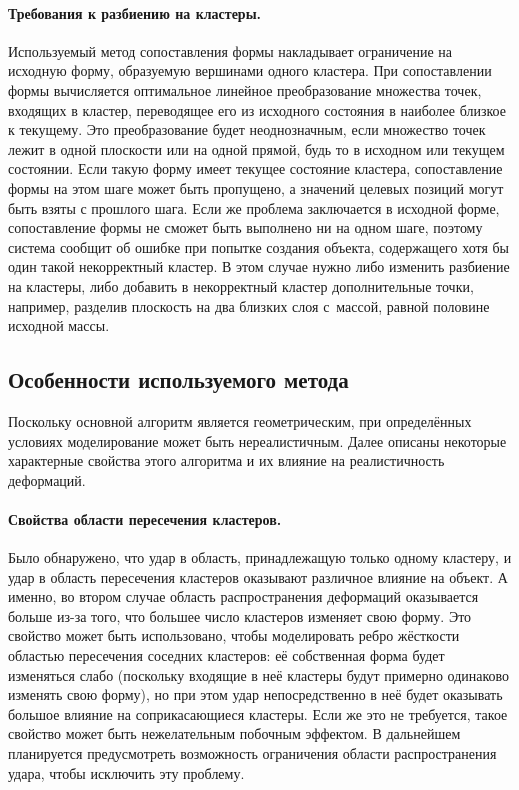 \documentclass[a4paper, 14pt, titlepage]{extarticle}
\begin{document}
      \paragraph{Требования к разбиению на кластеры.}
      Используемый метод сопоставления формы накладывает ограничение на исходную форму, образуемую
      вершинами одного кластера. При сопоставлении формы вычисляется оптимальное линейное преобразование
      множества точек, входящих в кластер, переводящее его из исходного состояния в наиболее близкое
      к текущему. Это преобразование будет неоднозначным, если множество точек лежит в одной
      плоскости или на одной прямой, будь то в исходном или текущем состоянии. Если такую форму
      имеет текущее состояние кластера, сопоставление формы на этом шаге может быть пропущено, а значений
      целевых позиций могут быть взяты с прошлого шага. Если же проблема заключается в
      исходной форме, сопоставление формы не сможет быть выполнено ни на одном шаге, поэтому система сообщит
      об ошибке при попытке создания объекта, содержащего хотя бы один такой некорректный кластер.
      В этом случае нужно либо изменить разбиение на кластеры, либо добавить в некорректный кластер
      дополнительные точки, например, разделив плоскость на два близких слоя с~массой, равной
      половине исходной массы.

    \subsection{Особенности используемого метода}\label{ssec:special_features}

      Поскольку основной алгоритм является геометрическим, при определённых условиях моделирование
      может быть нереалистичным. Далее описаны некоторые характерные свойства этого алгоритма и их
      влияние на реалистичность деформаций.

      \paragraph{Свойства области пересечения кластеров.} Было обнаружено, что удар в область,
      принадлежащую только одному кластеру, и удар в область пересечения кластеров оказывают
      различное влияние на объект. А именно, во втором случае область распространения деформаций
      оказывается больше из-за того, что большее число кластеров изменяет свою форму. Это свойство
      может быть использовано, чтобы моделировать ребро жёсткости областью пересечения соседних
      кластеров: её собственная форма будет изменяться слабо (поскольку входящие в неё кластеры
      будут примерно одинаково изменять свою форму), но при этом удар непосредственно в неё будет
      оказывать большое влияние на соприкасающиеся кластеры. Если же это не требуется, такое
      свойство может быть нежелательным побочным эффектом. В дальнейшем планируется предусмотреть
      возможность ограничения области распространения удара, чтобы исключить эту проблему.
\end{document}
